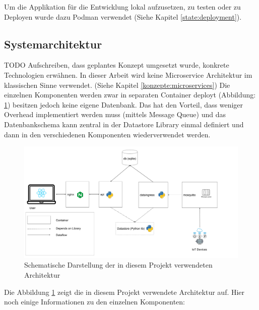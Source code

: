 Um die Applikation für die Entwicklung lokal aufzusetzen, zu testen oder zu Deployen wurde dazu
Podman verwendet (Siehe Kapitel \ref{state:deployment}).


\subsection{Systemarchitektur}
\label{architekturentscheidung}
TODO Aufschreiben, dass geplantes Konzept umgesetzt wurde, konkrete Technologien erwähnen.
In dieser Arbeit wird keine Microservice Architektur im klassischen Sinne verwendet. (Siehe Kapitel \ref{konzepte:microservices})
Die einzelnen Komponenten werden zwar in separaten Container deployt (Abbildung: \ref{fig:smic-arch})
besitzen jedoch keine eigene Datenbank.
Das hat den Vorteil, dass weniger Overhead implementiert werden muss (mittels Message Queue)
und das Datenbankschema kann zentral in der Datastore Library einmal definiert
und dann in den verschiedenen Komponenten wiederverwendet werden.


\begin{figure}[h]
    \centering
    \includegraphics[width=1.0\textwidth]{gfx/smic-arch}
    \caption{
        Schematische Darstellung der in diesem Projekt verwendeten Architektur
    }
    \label{fig:smic-arch}
\end{figure}

Die Abbildung \ref{fig:smic-arch} zeigt die in diesem Projekt verwendete
Architektur auf. Hier noch einige Informationen zu den einzelnen Komponenten:



